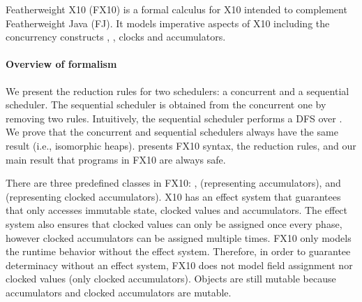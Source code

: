 Featherweight X10 (FX10) is a formal calculus for X10 intended to  complement Featherweight Java
(FJ).  It models imperative aspects of X10 including the concurrency
constructs \hfinish{}, \hasync{}, clocks and accumulators.

\paragraph{Overview of formalism}
We present the reduction rules for two schedulers:
    a concurrent and a sequential scheduler.
The sequential scheduler is obtained from the concurrent one by removing two rules.
Intuitively, the sequential scheduler performs a DFS over .
We prove that the concurrent and sequential schedulers always have the same result (i.e., isomorphic heaps).
 presents FX10 syntax,
     the reduction rules,
    and  our main result that programs in FX10 are always safe.

There are three predefined classes in FX10:
    ,
     (representing accumulators),
    and  (representing clocked accumulators).
X10 has an effect system that guarantees that
    \hasync{} only accesses immutable state, clocked values and accumulators.
The effect system also ensures that clocked values can only be assigned once every phase,
    however clocked accumulators can be assigned multiple times.
FX10 only models the runtime behavior without the effect system.
Therefore, in order to guarantee determinacy without an effect system,
    FX10 does not model field assignment nor clocked values (only clocked accumulators).
Objects are still mutable because accumulators and clocked accumulators
    are mutable.

